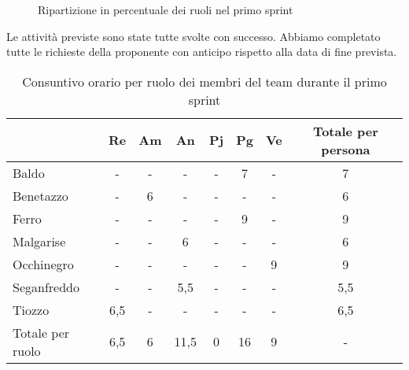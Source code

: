 \newblock
\begin{figure}[!h]
    \centering
    \caption{Ripartizione in percentuale dei ruoli nel primo sprint}
    \label{fig:4}
\end{figure}

\newpage
{}
Le attività previste sono state tutte svolte con successo. Abbiamo completato tutte le richieste della proponente con anticipo rispetto alla data di fine prevista.

\begin{table}[!h]
    \centering
    \begin{tabular}{ | l | c | c | c | c | c | c | c | }
        \hline
        \textbf{} & \textbf{Re} & \textbf{Am} & \textbf{An} & \textbf{Pj} & \textbf{Pg} & \textbf{Ve} & \textbf{Totale per persona} \\
        \hline
        Baldo            &  -   &  -   &  -   &  -   &  7   &  -   &  7   \\
        Benetazzo        &  -   &  6   &  -   &  -   &  -   &  -   &  6   \\
        Ferro            &  -   &  -   &  -   &  -   &  9   &  -   &  9   \\
        Malgarise        &  -   &  -   &  6   &  -   &  -   &  -   &  6   \\
        Occhinegro       &  -   &  -   &  -   &  -   &  -   &  9   &  9   \\
        Seganfreddo      &  -   &  -   &  5,5 &  -   &  -   &  -   &  5,5 \\
        Tiozzo           &  6,5 &  -   &  -   &  -   &  -   &  -   &  6,5 \\
        \hline
        Totale per ruolo &  6,5 &  6   & 11,5 &  0   & 16   &  9   &  -   \\
        \hline
    \end{tabular}
    \caption{Consuntivo orario per ruolo dei membri del team durante il primo sprint}
    \label{tab:14}
\end{table}

